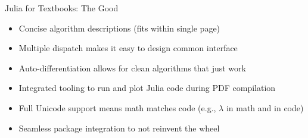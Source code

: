 \begin{frame}[fragile]{Julia for Textbooks: \textcolor{paloalto}{The Good}} \pause

\begin{itemize}
  \item \textcolor{paloalto}{Concise} algorithm descriptions (fits within single page) \pause
  \item \textcolor{paloalto}{Multiple dispatch} makes it easy to design common interface \pause
  \item \textcolor{paloalto}{Auto-differentiation} allows for clean algorithms that just work \pause
  \item \textcolor{paloalto}{Integrated tooling} to run and plot Julia code during PDF compilation \pause
  \item \textcolor{paloalto}{Full Unicode support} means math matches code (e.g., $\lambda$ in math and  in code) \pause
  \item \textcolor{paloalto}{Seamless package integration} to not reinvent the wheel
\end{itemize}

\pause

\phantom{---}

\small
{}

\end{frame}